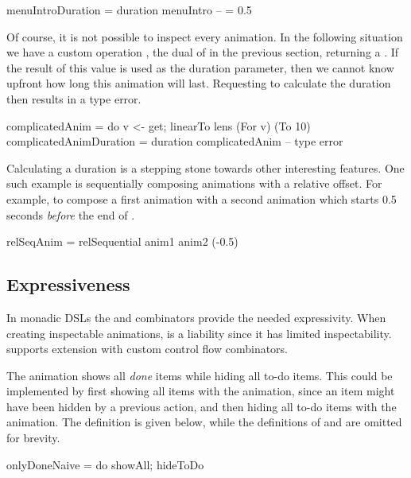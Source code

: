 \begin{spec}
menuIntroDuration = duration menuIntro -- = 0.5
\end{spec}

Of course, it is not possible to inspect every animation. In the following situation we have a custom operation , the dual of  in the previous section, returning a . If the result of this value is used as the duration parameter, then we cannot know upfront how long this animation will last. Requesting to calculate the duration then results in a type error.

\begin{spec}
complicatedAnim = do v <- get; linearTo lens (For v) (To 10)
complicatedAnimDuration = duration complicatedAnim -- type error
\end{spec}

Calculating a duration is a stepping stone towards other interesting features. One such example is sequentially composing animations with a relative offset. For example, to compose a first animation  with a second animation  which starts 0.5 seconds \emph{before} the end of .

\begin{spec}
relSeqAnim = relSequential anim1 anim2 (-0.5)
\end{spec}

\subsection{Expressiveness}
\label{sec:customcomb}

In monadic DSLs the \hs{>>=} and  combinators provide the needed expressivity. When creating inspectable animations, \hs{>>=} is a liability since it has limited inspectability. \dsl{} supports extension with custom control flow combinators.

The  animation shows all \emph{done} items while
hiding all to-do items. This could be implemented by first
showing all items with the  animation, since an item might have
been hidden by a previous action, and then hiding all to-do items with the
 animation. The definition is given below, while the definitions
of  and  are omitted for brevity.

\begin{spec}
onlyDoneNaive = do showAll; hideToDo
\end{spec}

